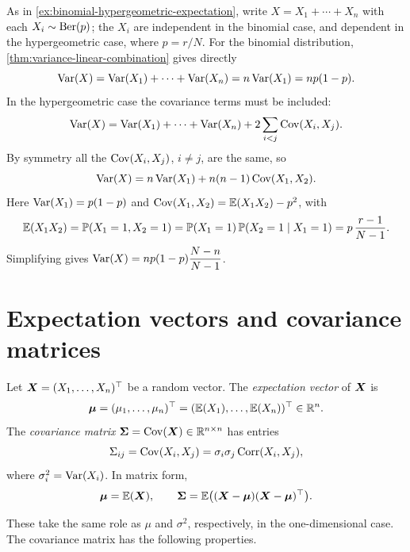 \begin{example}\label{ex:binomial-hypergeometric-variance}
As in \cref{ex:binomial-hypergeometric-expectation}, write $X = X_1 + \cdots + X_n$ with each $X_i \sim \mathrm{Ber}(p)$; the $X_i$ are independent in the binomial case, and dependent in the hypergeometric case, where $p = r/N$. For the binomial distribution, \cref{thm:variance-linear-combination} gives directly
\[
  \operatorname{Var}(X) = \operatorname{Var}(X_1) + \cdots + \operatorname{Var}(X_n) = n\operatorname{Var}(X_1) = np(1-p).
\]
In the hypergeometric case the covariance terms must be included:
\[
  \operatorname{Var}(X) = \operatorname{Var}(X_1) + \cdots + \operatorname{Var}(X_n) + 2\sum_{i<j} \operatorname{Cov}(X_i, X_j).
\]
By symmetry all the $\operatorname{Cov}(X_i, X_j)$, $i \ne j$, are the same, so
\[
  \operatorname{Var}(X) = n\operatorname{Var}(X_1) + n(n-1)\operatorname{Cov}(X_1, X_2).
\]
Here $\operatorname{Var}(X_1) = p(1-p)$ and $\operatorname{Cov}(X_1, X_2) = \operatorname{\mathbb{E}}(X_1X_2) - p^2$, with
\[
  \operatorname{\mathbb{E}}(X_1 X_2) = \mathbb{P}(X_1 = 1, X_2 = 1) = \mathbb{P}(X_1 = 1)\,\mathbb{P}(X_2 = 1 \mid X_1 = 1) = p\,\frac{r - 1}{N - 1}.
\]
Simplifying gives $\operatorname{Var}(X) = np(1-p)\dfrac{N - n}{N - 1}$.
\end{example}

\section{Expectation vectors and covariance matrices}\label{sec:covariance-matrix}

\begin{definition}\label{def:covariance-matrix}
Let $\bm{X} = (X_1, \ldots, X_n)^{\top}$ be a random vector. The \emph{expectation vector} of $\bm{X}$ is
\[
  \bm{\mu} = (\mu_1, \ldots, \mu_n)^{\top} = (\operatorname{\mathbb{E}}(X_1), \ldots, \operatorname{\mathbb{E}}(X_n))^{\top} \in \mathbb{R}^n.
\]
The \emph{covariance matrix} $\bm{\Sigma} = \operatorname{Cov}(\bm{X}) \in \mathbb{R}^{n \times n}$ has entries
\[
  \Sigma_{ij} = \operatorname{Cov}(X_i, X_j) = \sigma_i\sigma_j\operatorname{Corr}(X_i, X_j),
\]
where $\sigma_i^2 = \operatorname{Var}(X_i)$. In matrix form,
\[
  \bm{\mu} = \operatorname{\mathbb{E}}(\bm{X}), \qquad \bm{\Sigma} = \operatorname{\mathbb{E}}\bigl((\bm{X} - \bm{\mu})(\bm{X} - \bm{\mu})^{\top}\bigr).
\]
\end{definition}

These take the same role as $\mu$ and $\sigma^2$, respectively, in the one-dimensional case. The covariance matrix has the following properties.

